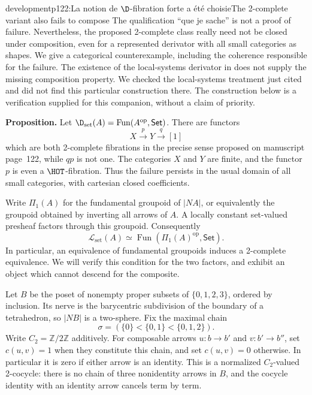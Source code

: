 \begin{dcomment}{development}{p122:La notion de $\D$-fibration forte a été choisie}{The 2-complete variant also fails to compose}
The qualification ``que je sache'' is not a proof of failure. Nevertheless, the proposed 2-complete class really need not be closed under composition, even for a represented derivator with all small categories as shapes. We give a categorical counterexample, including the coherence responsible for the failure. The existence of the local-systems derivator in \citet[Theorem~3.13]{Cisinski2009LocallyConstant} does not supply the missing composition property. We checked the local-systems treatment just cited and did not find this particular construction there. The construction below is a verification supplied for this companion, without a claim of priority.

\textbf{Proposition.}\ours\quad
Let $\D_{\mathrm{set}}(A)=\operatorname{Fun}(A^{\mathrm{op}},\mathsf{Set})$. There are functors
\[
 X\xrightarrow{p}Y\xrightarrow{q}[1]
\]
which are both 2-complete fibrations in the precise sense proposed on manuscript page~122, while $qp$ is not one. The categories $X$ and $Y$ are finite, and the functor $p$ is even a $\HOT$-fibration. Thus the failure persists in the usual domain of all small categories, with cartesian closed coefficients.

Write $\Pi_1(A)$ for the fundamental groupoid of $|NA|$, or equivalently the groupoid obtained by inverting all arrows of $A$. A locally constant set-valued presheaf factors through this groupoid. Consequently
\[
 \mathcal L_{\mathrm{set}}(A)
 \simeq\operatorname{Fun}(\Pi_1(A)^{\mathrm{op}},\mathsf{Set}).
\]
In particular, an equivalence of fundamental groupoids induces a 2-complete equivalence. We will verify this condition for the two factors, and exhibit an object which cannot descend for the composite.

Let $B$ be the poset of nonempty proper subsets of $\{0,1,2,3\}$, ordered by inclusion. Its nerve is the barycentric subdivision of the boundary of a tetrahedron, so $|NB|$ is a two-sphere. Fix the maximal chain
\[
 \sigma=(\{0\}<\{0,1\}<\{0,1,2\}).
\]
Write $C_2=\mathbb Z/2\mathbb Z$ additively. For composable arrows $u:b\to b'$ and $v:b'\to b''$, set $c(u,v)=1$ when they constitute this chain, and set $c(u,v)=0$ otherwise. In particular it is zero if either arrow is an identity. This is a normalized $C_2$-valued 2-cocycle: there is no chain of three nonidentity arrows in $B$, and the cocycle identity with an identity arrow cancels term by term.


\end{dcomment}
